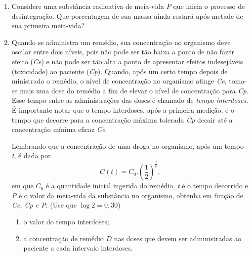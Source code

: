 \begin{enumerate}
\item Considere uma substância radioativa de meia-vida $P$ que inicia o processo de desintegração. Que porcentagem de sua massa ainda restará após metade de sua primeira meia-vida?

\item Quando se administra um remédio, sua concentração no organismo deve oscilar entre dois níveis, pois não pode ser tão baixa a ponto de não fazer efeito (\emph{Ce}) e não pode ser tão alta a ponto de apresentar efeitos indesejáveis (toxicidade) ao paciente (\emph{Cp}). Quando, após um certo tempo depois de ministrado o remédio, o nível de concentração no organismo atinge \emph{Ce}, toma-se mais uma dose do remédio a fim de elevar o nível de concentração para \emph{Cp}. Esse tempo entre as administrações das doses é chamado de \emph{tempo interdoses}. É importante notar que o tempo interdoses, após a primeira medição, é o tempo que decorre para a concentração máxima tolerada \emph{Cp} decair até a concentração mínima eficaz \emph{Ce}.

Lembrando que a concentração de uma droga no organismo, após um tempo \emph{t}, é dada por
\[C(t)=C_0 . \left(\dfrac{1}{2}\right)^{\frac{t}{p}},\]
em que $C_0$ é a quantidade inicial ingerida do remédio, \emph{t} é o tempo decorrido e \emph{P} é o valor da meia-vida da substância no organismo, obtenha em função de \emph{Ce, Cp e P}: (Use que $\log 2=0,30$)
\begin{enumerate}
\item o valor do tempo interdoses;
\item a concentração de remédio $D$ nas doses que devem ser administradas ao paciente a cada intervalo interdoses.
\end{enumerate}
\end{enumerate}
